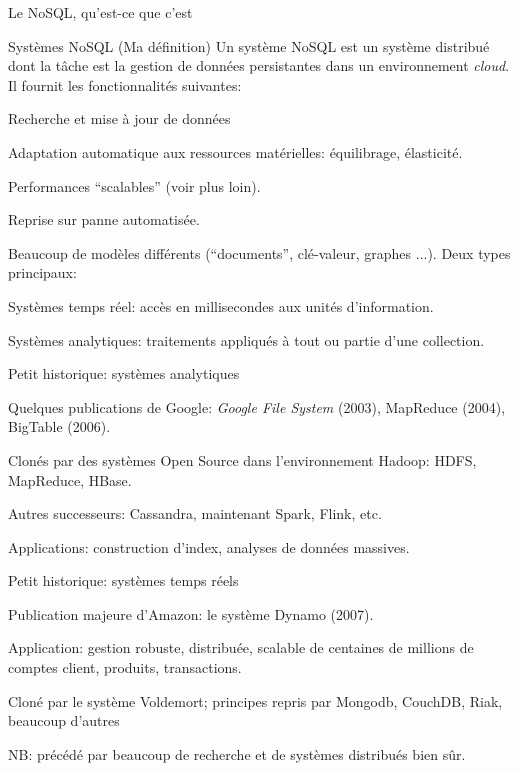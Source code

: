\begin{frame}{Le NoSQL, qu'est-ce que c'est}

\begin{defblock}{Systèmes NoSQL (Ma définition)}
Un système NoSQL est un système distribué dont la tâche est la gestion de données persistantes
dans un environnement \textit{cloud}. Il fournit les fonctionnalités suivantes:

\begin{redbullet}
  \item Recherche et mise à jour de données 
  \item Adaptation automatique aux ressources matérielles: équilibrage, élasticité.
  \item Performances ``scalables'' (voir plus loin).
  \item Reprise sur panne automatisée.
\end{redbullet}
\end{defblock}

Beaucoup de modèles différents (``documents'', clé-valeur, graphes ...). Deux
types principaux:

\begin{redbullet}
  \item Systèmes \alert{temps réel}: accès en millisecondes aux unités d'information.
  \item Systèmes \alert{analytiques}: traitements appliqués à tout ou partie d'une collection.
\end{redbullet}

\end{frame}


\begin{frame}{Petit historique: systèmes analytiques}

Quelques publications de Google: \textit{Google File System} (2003),
MapReduce (2004), BigTable (2006).

\vfill

Clonés par des systèmes Open Source dans l'environnement Hadoop: HDFS, MapReduce, HBase.

\vfill

Autres successeurs: Cassandra, maintenant Spark, Flink, etc.

\vfill
Applications: construction d'index, analyses de données massives.
 
\end{frame}

\begin{frame}{Petit historique: systèmes temps réels}

Publication majeure d'Amazon: le système Dynamo (2007).

\vfill

Application: gestion robuste, distribuée, scalable de centaines de millions de comptes
client, produits, transactions.

\vfill

Cloné par le système Voldemort; principes repris par Mongodb, CouchDB, Riak, beaucoup d'autres

\vfill

NB: précédé par beaucoup de recherche et de systèmes distribués bien sûr.

\end{frame}

